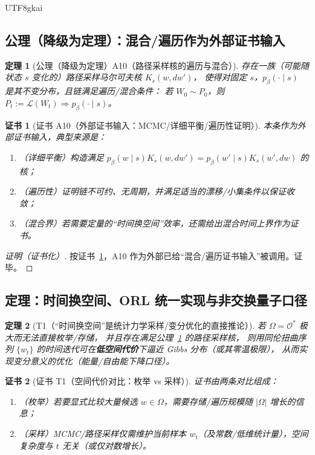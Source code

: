 \documentclass[12pt]{article}
\newtheorem{theorem}{定理}[section]
\newtheorem{Certificate}{证书}[section]
\begin{document}
\begin{CJK*}{UTF8}{gkai}
\subsection{公理（降级为定理）：混合/遍历作为外部证书输入}
\label{subsec:tex27-ch10-axioms}

\begin{theorem}[公理（降级为定理）A10（路径采样核的遍历与混合）]
\label{thm:tex27-ch10-a10}
存在一族（可能随状态 $s$ 变化的）路径采样马尔可夫核 $K_s(w,dw')$，
使得对固定 $s$，$p_\beta(\cdot\mid s)$ 是其不变分布，且链满足遍历/混合条件：
若 $W_0\sim P_0$，则 $P_t:=\mathcal{L}(W_t)\Rightarrow p_\beta(\cdot\mid s)$。
\end{theorem}

\begin{Certificate}[证书 A10（外部证书输入：MCMC/详细平衡/遍历性证明）]
\label{cert:tex27-ch10-a10}
本条作为外部证书输入，典型来源是：
\begin{enumerate}
  \item（详细平衡）构造满足 $p_\beta(w\mid s)K_s(w,dw')=p_\beta(w'\mid s)K_s(w',dw)$ 的核；
  \item（遍历性）证明链不可约、无周期，并满足适当的漂移/小集条件以保证收敛；
  \item（混合界）若需要定量的“时间换空间”效率，还需给出混合时间上界作为证书。
\end{enumerate}
\end{Certificate}

\begin{proof}[证明（证书化）]
按证书~\ref{cert:tex27-ch10-a10}，A10 作为外部已给“混合/遍历证书输入”被调用。证毕。
\end{proof}

\subsection{定理：时间换空间、ORL 统一实现与非交换量子口径}
\label{subsec:tex27-ch10-theorems}

\begin{theorem}[T1（“时间换空间”是统计力学采样/变分优化的直接推论）]
\label{thm:tex27-ch10-t1}
若 $\Omega=\mathcal{O}^*$ 极大而无法直接枚举/存储，
并且存在满足公理~\ref{thm:tex27-ch10-a10} 的路径采样核，
则用同伦扭曲序列 $\{w_t\}$ 的时间迭代可在\textbf{低空间代价}下逼近 Gibbs 分布（或其零温极限），
从而实现变分意义的优化（能量/自由能下降口径）。
\end{theorem}

\begin{Certificate}[证书 T1（空间代价对比：枚举 vs 采样）]
\label{cert:tex27-ch10-t1}
证书由两条对比组成：
\begin{enumerate}
  \item（枚举）若要显式比较大量候选 $w\in\Omega$，需要存储/遍历规模随 $|\Omega|$ 增长的信息；
  \item（采样）MCMC/路径采样仅需维护当前样本 $w_t$（及常数/低维统计量），空间复杂度与 $t$ 无关（或仅对数增长）。
\end{enumerate}
\end{Certificate}


\end{CJK*}
\end{document}
